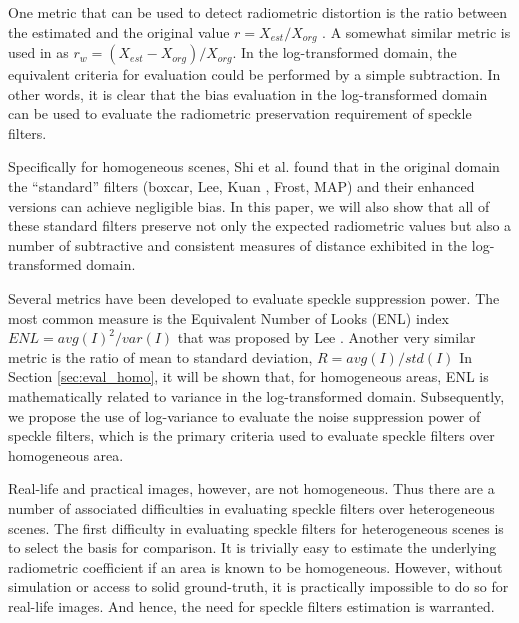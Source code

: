 \documentclass[journal]{IEEEtran}
\begin{document}
One metric that can be used to detect radiometric distortion is the ratio between the estimated and the 
	original value $r = X_{est} / X_{org}$ \cite{Oliver_2004_SciTech} \cite{Medeiros_2003_IJRS}.
A somewhat similar metric is used in \cite{Wang_2005_MIPR} as $r_w = (X_{est} - X_{org} )/ X_{org}$.
In the log-transformed domain, the equivalent criteria for evaluation could be performed by a simple subtraction.
In other words, it is clear that the bias evaluation in the log-transformed domain 
	can be used to evaluate the radiometric preservation requirement of speckle filters. 

Specifically for homogeneous scenes, Shi et al. \cite{Shi_IGARSS_1994} found that 
	in the original domain the ``standard'' filters (boxcar, Lee\cite{Lee_PAMI_1980}, 
	Kuan \cite{Kuan_1985_PAMI}, Frost\cite{Frost_PAMI_1982}, 
	MAP\cite{Lopes_IGARSS_1990}) and their enhanced versions \cite{Lopes_TGRS_1990} can achieve negligible bias. 
In this paper, we will also show that all of these standard filters preserve
	not only the expected radiometric values
	but also a number of subtractive and consistent measures of distance exhibited in the log-transformed domain.

Several metrics have been developed to evaluate speckle suppression power.
The most common measure is the Equivalent Number of Looks (ENL) index 
$ENL=avg(I)^2/var(I)$
that was proposed by Lee \cite{Lee_1981_CGIP}.
Another very similar metric is the ratio of mean to standard deviation, $R=avg(I)/std(I)$ \cite{Gagnon_SPIEProc_1997} 
In Section \ref{sec:eval_homo}, it will be shown that, for homogeneous areas, ENL is mathematically related to variance in the 
	log-transformed domain.
Subsequently, we propose the use of log-variance to evaluate the noise suppression power of speckle filters, 
	which is the primary criteria used to evaluate speckle filters over homogeneous area.

Real-life and practical images, however, are not homogeneous.
Thus there are a number of associated difficulties in evaluating speckle filters over heterogeneous scenes.
The first difficulty in evaluating speckle filters for heterogeneous scenes is to select the basis for comparison. 
It is trivially easy to estimate the underlying radiometric coefficient if an area is known to be homogeneous.
However, without simulation or access to solid ground-truth, it is practically impossible to do so for 
	real-life images.
And hence, the need for speckle filters estimation is warranted.
\end{document}
